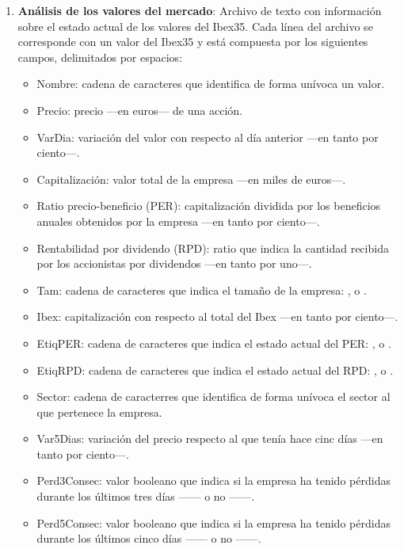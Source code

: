 \documentclass[a4paper, 11pt, titlepage]{article}
\begin{document}
\begin{enumerate}
        \item \textbf{Análisis de los valores del mercado}: Archivo de texto con información sobre el estado actual de  los valores del Ibex35. Cada línea del archivo se corresponde con un valor del Ibex35 y está compuesta por los siguientes campos, delimitados por espacios:
        \begin{itemize}
            \item Nombre: cadena de caracteres que identifica de forma unívoca un valor.
            \item Precio: precio ---en euros--- de una acción.
            \item VarDia: variación del valor con respecto al día anterior ---en tanto por ciento---.
            \item Capitalización: valor total de la empresa ---en miles de euros---.
            \item Ratio precio-beneficio (PER): capitalización dividida por los beneficios anuales obtenidos por la empresa ---en tanto por ciento---.
            \item Rentabilidad por dividendo (RPD): ratio que indica la cantidad recibida por los accionistas por dividendos ---en tanto por uno---.
            \item Tam: cadena de caracteres que indica el tamaño de la empresa: ,  o .
            \item Ibex: capitalización con respecto al total del Ibex ---en tanto por ciento---.
            \item EtiqPER: cadena de caracteres que indica el estado actual del PER: ,  o .
            \item EtiqRPD: cadena de caracteres que indica el estado actual del RPD: ,  o .
            \item Sector: cadena de caracterres que identifica de forma unívoca el sector al que pertenece la empresa.
            \item Var5Dias: variación del precio respecto al que tenía hace cinc días ---en tanto por ciento---.
            \item Perd3Consec: valor booleano que indica si la empresa ha tenido pérdidas durante los últimos tres días ------ o no ------.
            \item Perd5Consec: valor booleano que indica si la empresa ha tenido pérdidas durante los últimos cinco días ------ o no ------.

\end{itemize}
\end{enumerate}
\end{document}
